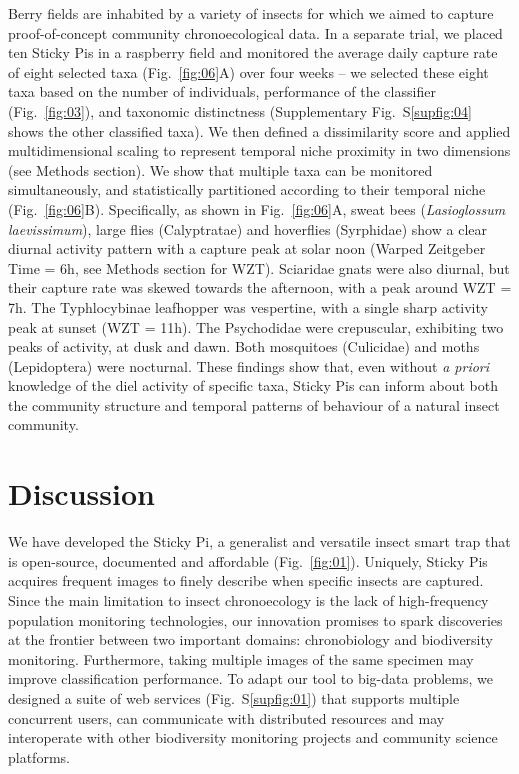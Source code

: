 \documentclass[fleqn,10pt]{wlscirep}
\begin{document}
Berry fields are inhabited by a variety of insects for which we aimed to capture proof-of-concept community chronoecological data. In a separate trial, we placed ten Sticky Pis in a raspberry field and monitored the average daily capture rate of eight selected taxa (Fig.~\ref{fig:06}A) over four weeks – we selected these eight taxa based on the number of individuals, performance of the classifier (Fig.~\ref{fig:03}), and taxonomic distinctness (Supplementary Fig.~S\ref{supfig:04} shows the other classified taxa). We then defined a dissimilarity score and applied multidimensional scaling to represent temporal niche proximity in two dimensions (see Methods section). We show that multiple taxa can be monitored simultaneously, and statistically partitioned according to their temporal niche (Fig.~\ref{fig:06}B). Specifically, as shown in Fig.~\ref{fig:06}A, sweat bees (\emph{Lasioglossum laevissimum}), large flies (Calyptratae) and hoverflies (Syrphidae) show a clear diurnal activity pattern with a capture peak at solar noon (Warped Zeitgeber Time = 6h, see Methods section for WZT). Sciaridae gnats were also diurnal, but their capture rate was skewed towards the afternoon, with a peak around WZT = 7h. The Typhlocybinae leafhopper was vespertine, with a single sharp activity peak at sunset (WZT = 11h). The Psychodidae were crepuscular, exhibiting two peaks of activity, at dusk and dawn. Both mosquitoes (Culicidae) and moths (Lepidoptera) were nocturnal. These findings show that, even without \emph{a priori} knowledge of the diel activity of specific taxa, Sticky Pis can inform about both the community structure and temporal patterns of behaviour of a natural insect community.


\section*{Discussion}


We have developed the Sticky Pi, a generalist and versatile insect smart trap that is open-source, documented and affordable (Fig.~\ref{fig:01}). Uniquely, Sticky Pis acquires frequent images to finely describe when specific insects are captured. Since the main limitation to insect chronoecology is the lack of high-frequency population monitoring technologies\cite{dominoni_methods_2017}, our innovation promises to spark discoveries at the frontier between two important domains: chronobiology and biodiversity monitoring. Furthermore, taking multiple images of the same specimen may improve classification performance. To adapt our tool to big-data problems, we designed a suite of web services (Fig.~S\ref{supfig:01}) that supports multiple concurrent users, can communicate with distributed resources and may interoperate with other biodiversity monitoring projects and community science platforms\cite{pocock_chapter_2018}.
\end{document}
